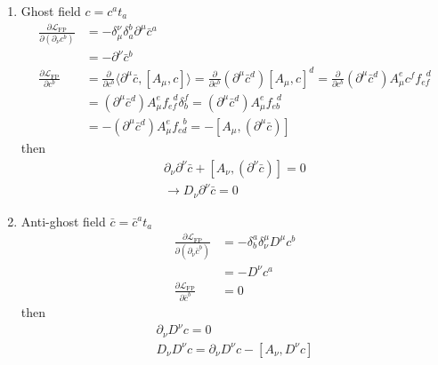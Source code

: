 \documentclass[10pt,a4paper]{article}
\theoremstyle{definition}
\begin{document}
\begin{enumerate}
\begin{enumerate}
\item Ghost field $c= c^a t_a$
\begin{align}
\frac{\partial\mathcal{L}_\text{FP}}{\partial (\partial_\nu c^b)}
&=-\delta^\nu_\mu\delta^b_a\partial^\mu\bar{c}^a\\
&=-\partial^\nu\bar{c}^b\\
\frac{\partial\mathcal{L}_\text{FP}}{\partial c^b}
&=\frac{\partial}{\partial c^b}\langle\partial^\mu\bar{c},[A_\mu,c]\rangle
=\frac{\partial}{\partial c^b}(\partial^\mu\bar{c}^d)[A_\mu,c]^d
=\frac{\partial}{\partial c^b}(\partial^\mu\bar{c}^d)A_\mu^ec^f f_{ef}^{\;\;d}\\
&=(\partial^\mu\bar{c}^d)A_\mu^e f_{ef}^{\;\;d}\delta^f_b
=(\partial^\mu\bar{c}^d)A_\mu^e f_{eb}^{\;\;d}\\
&=-(\partial^\mu\bar{c}^d)A_\mu^e f_{ed}^{\;\;b}
=-[A_\mu,(\partial^\mu\bar{c})]
\end{align}
then
\begin{align}
\partial_\nu\partial^\nu\bar{c}+[A_\nu,(\partial^\nu\bar{c})]=0\\
\boxed{\rightarrow D_\nu\partial^\nu\bar{c}=0}
\end{align}


\item Anti-ghost field $\bar{c}=\bar{c}^a t_a$
\begin{align}
\frac{\partial\mathcal{L}_\text{FP}}{\partial (\partial_\nu\bar{c}^b)}
&=-\delta^a_b\delta^\mu_\nu D^\mu c^b\\
&=-D^\nu c^a\\
\frac{\partial\mathcal{L}_\text{FP}}{\partial\bar{c}^b}
&=0
\end{align}
then
\begin{align}
\boxed{\partial_\nu D^\nu c=0}\\
D_\nu D^\nu c=\partial_\nu D^\nu c-[A_\nu,D^\nu c]
\end{align}
\end{enumerate}


\end{enumerate}
\end{document}
